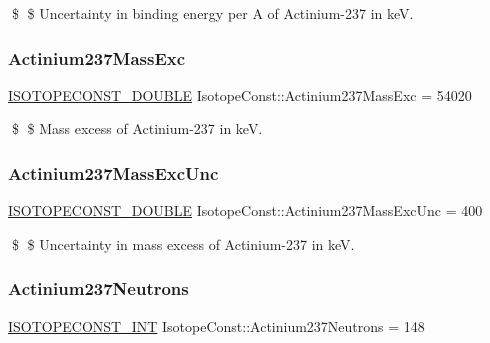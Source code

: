 \$ \$ Uncertainty in binding energy per A of Actinium-\/237 in keV. \mbox{\label{group___isotope_const-_actinium-_ac237_ga20e5fcc35e02d4f08656b660d8d93079}} 
\subsubsection{\texorpdfstring{Actinium237\+Mass\+Exc}{Actinium237MassExc}}
{\footnotesize\ttfamily \mbox{\hyperlink{group___isotope_const-_macros_ga8f45a7272ce02c0b4c65c44636ed719a}{I\+S\+O\+T\+O\+P\+E\+C\+O\+N\+S\+T\+\_\+\+D\+O\+U\+B\+LE}} Isotope\+Const\+::\+Actinium237\+Mass\+Exc = 54020}

\$ \$ Mass excess of Actinium-\/237 in keV. \mbox{\label{group___isotope_const-_actinium-_ac237_ga05f73d9a966f2ba48b7ecae44879cc84}} 
\subsubsection{\texorpdfstring{Actinium237\+Mass\+Exc\+Unc}{Actinium237MassExcUnc}}
{\footnotesize\ttfamily \mbox{\hyperlink{group___isotope_const-_macros_ga8f45a7272ce02c0b4c65c44636ed719a}{I\+S\+O\+T\+O\+P\+E\+C\+O\+N\+S\+T\+\_\+\+D\+O\+U\+B\+LE}} Isotope\+Const\+::\+Actinium237\+Mass\+Exc\+Unc = 400}

\$ \$ Uncertainty in mass excess of Actinium-\/237 in keV. \mbox{\label{group___isotope_const-_actinium-_ac237_gabcc08affae54df0adcba2fae9476695b}} 
\subsubsection{\texorpdfstring{Actinium237\+Neutrons}{Actinium237Neutrons}}
{\footnotesize\ttfamily \mbox{\hyperlink{group___isotope_const-_macros_ga5f18360b3e99483a35c32d789e62621c}{I\+S\+O\+T\+O\+P\+E\+C\+O\+N\+S\+T\+\_\+\+I\+NT}} Isotope\+Const\+::\+Actinium237\+Neutrons = 148}

